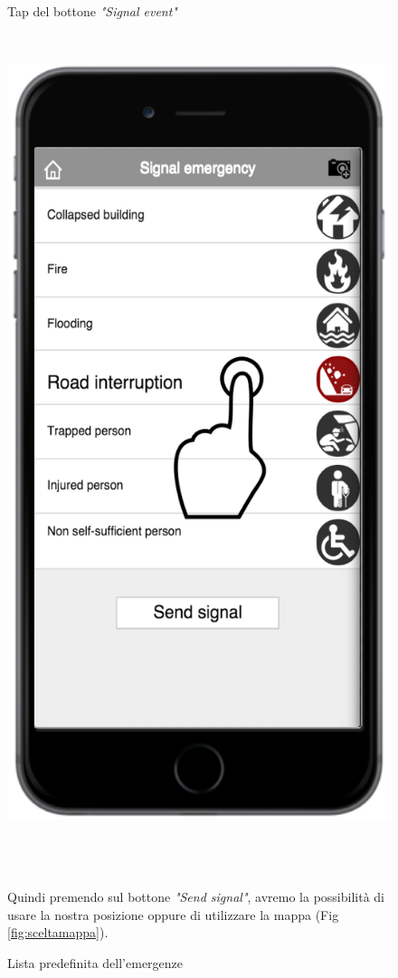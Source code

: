 \begin{figure}
\begin{minipage}[b]{6cm}
	\caption{Tap del bottone \textit{"Signal event"}}
	\label{fig:buttonsegnala}
 \end{minipage}
 \ \hspace{6 mm} \hspace{7 mm} \
 \begin{minipage}[b]{6cm}
\includegraphics[scale=0.6]{interfaccia/segnalatap.png}
	\caption{Lista predefinita dell'emergenze}
	\label{fig:lista-em}
	
 \end{minipage}
 \\ \\ \\
Quindi premendo sul bottone \textit{"Send signal"}, avremo la possibilità di usare la nostra posizione oppure di utilizzare la mappa (Fig \ref{fig:sceltamappa}).
\end{figure}




